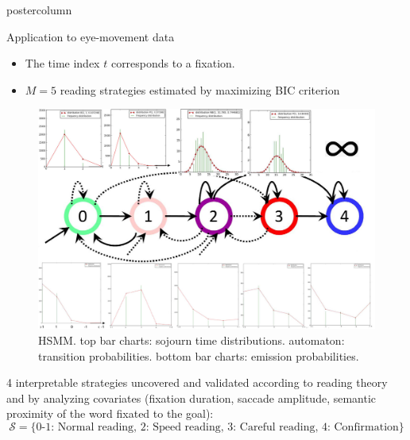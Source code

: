 \documentclass[final,hyperref={pdfpagelabels=false}]{beamer}
\begin{document}
\begin{frame}
\begin{columns}
\begin{column}{.50\textwidth}
\begin{beamercolorbox}[center,wd=\textwidth]{postercolumn}
\begin{minipage}[T]{.98\textwidth}
{            \vfill
            \begin{block}{Application to eye-movement data}
                \begin{itemize}
                    \item[\bullet] The time index $t$ corresponds to a fixation.
                    \item[\bullet] $M = 5$ reading strategies estimated by maximizing BIC criterion
                \end{itemize}
                \begin{figure}[h]
                    \centering
                    \includegraphics[width=32.67cm]{hsmm.jpg}
                    \caption{HSMM. top bar charts: sojourn time distributions.
                    automaton: transition probabilities.
                    bottom bar charts: emission probabilities.}
                \end{figure}
                4 interpretable strategies uncovered and validated according to reading theory and by analyzing covariates
                (fixation duration, saccade amplitude, semantic proximity of the word fixated to the goal):
                {\small$$\mathcal{S}=\{\text{0-1: Normal reading, 2: Speed reading, 3: Careful reading, 4: Confirmation}\}$$}
                \begin{minipage}{0.47\textwidth}
                    \begin{figure}[h]

\end{figure}
\end{minipage}
\end{block}}
\end{minipage}
\end{beamercolorbox}
\end{column}
\end{columns}
\end{frame}
\end{document}
